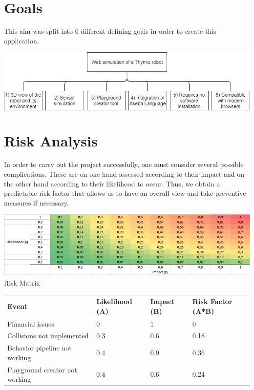 \documentclass{scrreprt}
\begin{document}
\section{Goals}

This aim was split into 6 different defining goals in order to create this application.

\begin{center}
  \includegraphics[width=\textwidth]{./goals}
\end{center}

\section{Risk Analysis}
In order to carry out the project successfully, one must consider several possible complications. These are on one hand assessed according to their impact and on the other hand according to their likelihood to occur. 
Thus, we obtain a predictable risk factor that allows us to have an overall view and take preventive measures if necessary.

\begin{center}
  \includegraphics[width=\textwidth]{./risk-matrix}\\
  Risk Matrix
\end{center}

\begin{tabular}{p{2cm} p{2cm} p{2cm} p{2cm}}
  Event & Likelihood (A) & Impact (B) & Risk Factor (A*B) \\ \hline
  Financial issues & 0 & 1 & 0 \\
  Collisions not implemented & 0.3 & 0.6 & 0.18 \\
  Behavior pipeline not working & 0.4 & 0.9 & 0.36 \\
  Playground creator not working & 0.4 & 0.6 & 0.24 \\
\end{tabular}
\end{document}
